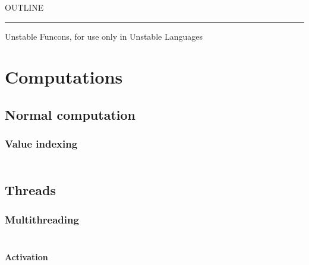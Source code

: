 


    OUTLINE
  \tableofcontents
\begin{center}
\rule{3in}{0.4pt}
\end{center}

Unstable Funcons, for use only in Unstable Languages

\section{Computations}\hypertarget{computations}{}\label{computations}

\subsection{Normal computation}\hypertarget{normal-computation}{}\label{normal-computation}

\subsubsection{Value indexing}\hypertarget{value-indexing}{}\label{value-indexing}

\begin{align*}
  [ \
  \KEY{Funcon} \quad & \NAMEHYPER{../../../../../Unstable-Funcons-beta/Computations/Normal}{Indexing}{initialise-index} \\
  \KEY{Funcon} \quad & \NAMEHYPER{../../../../../Unstable-Funcons-beta/Computations/Normal}{Indexing}{allocate-index} \\
  \KEY{Funcon} \quad & \NAMEHYPER{../../../../../Unstable-Funcons-beta/Computations/Normal}{Indexing}{lookup-index}
  \ ]
\end{align*}
\subsection{Threads}\hypertarget{threads}{}\label{threads}

\subsubsection{Multithreading}\hypertarget{multithreading}{}\label{multithreading}

\begin{align*}
  [ \
  \KEY{Funcon} \quad & \NAMEHYPER{../../../../../Unstable-Funcons-beta/Computations/Threads}{Multithreading}{thread-joinable}
  \ ]
\end{align*}
\paragraph{Activation}\hypertarget{activation}{}\label{activation}

